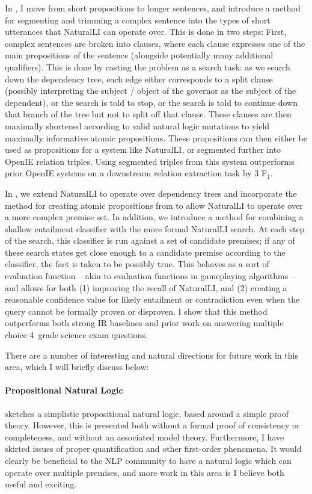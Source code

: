 In , I move from short propositions to longer sentences, and introduce a method for
  segmenting and trimming a complex sentence into the types of short utterances that NaturalLI can
  operate over.
This is done in two steps: First, complex sentences are broken into clauses, where each clause
  expresses one of the main propositions of the sentence (alongside potentially many additional
  qualifiers).
This is done by casting the problem as a search task: as we search down the dependency tree, each
  edge either corresponds to a split clause (possibly interpreting the subject / object of the
  governor as the subject of the dependent), or the search is told to stop, or the search is told
  to continue down that branch of the tree but not to split off that clause.
These clauses are then maximally shortened according to valid natural logic mutations to yield
  maximally informative atomic propositions.
These propositions can then either be used as propositions for a system like NaturalLI, or segmented
  further into OpenIE relation triples.
Using segmented triples from this system outperforms prior OpenIE systems on a downstream relation
  extraction task by 3 F$_1$.

In , we extend NaturalLI to operate over dependency trees and incorporate the method for
  creating atomic propositions from  to allow NaturalLI to operate over a more complex
  premise set.
In addition, we introduce a method for combining a shallow entailment classifier with the more formal
  NaturalLI search.
At each step of the search, this classifier is run against a set of candidate premises; if any of these
  search states get close enough to a candidate premise according to the classifier, the fact is taken
  to be possibly true.
This behaves as a sort of evaluation function -- akin to evaluation functions in gameplaying algorithms --
  and allows for both (1) improving the recall of NaturalLI, and (2) creating a reasonable confidence
  value for likely entailment or contradiction even when the query cannot be formally proven or disproven.
I show that this method outperforms both strong IR baselines and prior work on answering multiple choice
  4\nth\ grade science exam questions.

There are a number of interesting and natural directions for future work in this area,
  which I will briefly discuss below:

\paragraph{Propositional Natural Logic}  sketches a simplistic propositional
  natural logic, based around a simple proof theory.
However, this is presented both without a formal proof of consistency or completeness, and without an
  associated model theory.
Furthermore, I have skirted issues of proper quantification and other first-order phenomena.
It would clearly be beneficial to the NLP community to have a natural logic which can operate over
  multiple premises, and more work in this area is I believe both useful and exciting.

